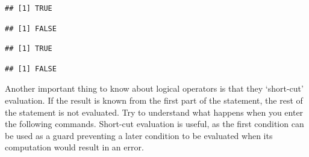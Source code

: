 \documentclass[krantz2]{krantz}\usepackage{knitr}%
\begin{document}
\begin{knitrout}\footnotesize
{}\color{fgcolor}\begin{kframe}
\begin{alltt}
\end{alltt}
\begin{verbatim}
## [1] TRUE
\end{verbatim}
\begin{alltt}
\end{alltt}
\begin{verbatim}
## [1] FALSE
\end{verbatim}
\begin{alltt}
 \hlopt{&} 
\end{alltt}
\begin{verbatim}
## [1] TRUE
\end{verbatim}
\begin{alltt}
 \hlopt{&} 
\end{alltt}
\begin{verbatim}
## [1] FALSE
\end{verbatim}
\end{kframe}
\end{knitrout}

Another important thing to know about logical operators is that they `short-cut' evaluation. If the result is known from the first part of the statement, the rest of the statement is not evaluated. Try to understand what happens when you enter the following commands. Short-cut evaluation is useful, as the first condition can be used as a guard preventing a later condition to be evaluated when its computation would result in an error.
\end{document}
